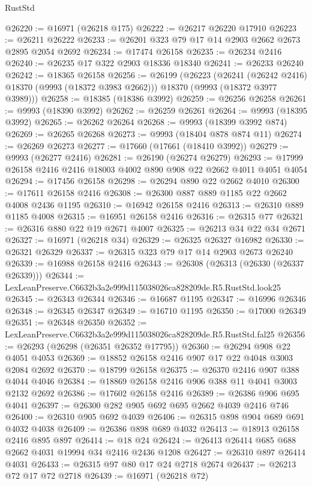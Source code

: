 \begin{lexlean}{RustStd}
\begin{coremodule}
@26220 := @16971 (@26218 @175)
@26222 := @26217 @26220 @17910
@26223 := @26211 @26222
@26233 := @26201 @323 @79 @17 @14 @2903 @2662 @2673 @2895 @2054 @2692
@26234 := @17474 @26158
@26235 := @26234 @2416
@26240 := @26235 @17 @322 @2903 @18336 @18340
@26241 := @26233 @26240
@26242 := @18365 @26158
@26256 := @26199
    (@26223
      (@26241 (@26242 @2416) @18370 (@9993 (@18372 @3983 @2662)))
      @18370
      (@9993 (@18372 @3977 @3989)))
@26258 := @18385 (@18386 @3992)
@26259 := @26256 @26258
@26261 := @9993 (@18390 @3992)
@26262 := @26259 @26261
@26264 := @9993 (@18395 @3992)
@26265 := @26262 @26264
@26268 := @9993 (@18399 @3992 @874)
@26269 := @26265 @26268
@26273 := @9993 (@18404 @878 @874 @11)
@26274 := @26269 @26273
@26277 := @17660 (@17661 (@18410 @3992))
@26279 := @9993 (@26277 @2416)
@26281 := @26190 (@26274 @26279)
@26293 := @17999 @26158 @2416 @2416 @18003 @4002 @890 @908 @22 @2662 @4011 @4051 @4054
@26294 := @17456 @26158
@26298 := @26294 @890 @22 @2662 @4010
@26300 := @17611 @26158 @2416
@26308 := @26300 @887 @889 @1185 @22 @2662 @4008 @2436 @1195
@26310 := @16942 @26158 @2416
@26313 := @26310 @889 @1185 @4008
@26315 := @16951 @26158 @2416
@26316 := @26315 @77
@26321 := @26316 @880 @22 @19 @2671 @4007
@26325 := @26213 @34 @22 @34 @2671
@26327 := @16971 (@26218 @34)
@26329 := @26325 @26327 @16982
@26330 := @26321 @26329
@26337 := @26315 @323 @79 @17 @14 @2903 @2673 @26240
@26339 := @16988 @26158 @2416
@26343 := @26308 (@26313 (@26330 (@26337 @26339)))
@26344 := LexLeanPreserve.C6632b3a2e999d115038026ca828209de.R5.RustStd.look25
@26345 := @26343 @26344
@26346 := @16687 @1195
@26347 := @16996 @26346
@26348 := @26345 @26347
@26349 := @16710 @1195
@26350 := @17000 @26349
@26351 := @26348 @26350
@26352 := LexLeanPreserve.C6632b3a2e999d115038026ca828209de.R5.RustStd.fal25
@26356 := @26293 (@26298 (@26351 @26352 @17795))
@26360 := @26294 @908 @22 @4051 @4053
@26369 := @18852 @26158 @2416 @907 @17 @22 @4048 @3003 @2084 @2692
@26370 := @18799 @26158
@26375 := @26370 @2416 @907 @388 @4044 @4046
@26384 := @18869 @26158 @2416 @906 @388 @11 @4041 @3003 @2132 @2692
@26386 := @17602 @26158 @2416
@26389 := @26386 @906 @695 @4041
@26397 := @26300 @282 @905 @692 @695 @2662 @4039 @2416 @746
@26400 := @26310 @905 @692 @4039
@26406 := @26315 @898 @904 @689 @691 @4032 @4038
@26409 := @26386 @898 @689 @4032
@26413 := @18913 @26158 @2416 @895 @897
@26414 := @18 @24
@26424 := @26413 @26414 @685 @688 @2662 @4031 @19994 @34 @2416 @2436 @1208
@26427 := @26310 @897 @26414 @4031
@26433 := @26315 @97 @80 @17 @24 @2718 @2674
@26437 := @26213 @72 @17 @72 @2718
@26439 := @16971 (@26218 @72)

\end{coremodule}
\end{lexlean}
